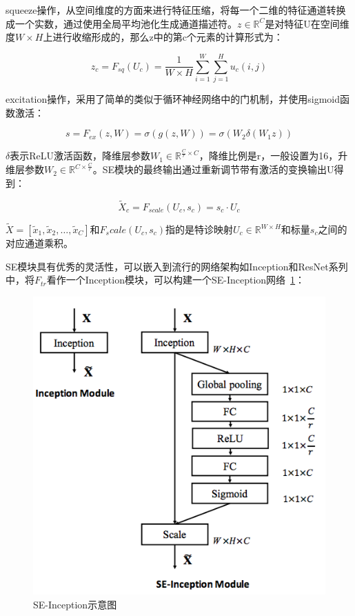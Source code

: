 squeeze操作，从空间维度的方面来进行特征压缩，将每一个二维的特征通道转换成一个实数，通过使用全局平均池化生成通道描述符。$z \in \mathbb{R}^C$是对特征U在空间维度$W \times H$上进行收缩形成的，那么z中的第c个元素的计算形式为：

\begin{displaymath}
	z_c = F_{sq}(U_c) = \frac{1}{W \times H}\sum_{i=1}^{W}\sum_{j=1}^{H}u_c(i, j)
\end{displaymath}

excitation操作，采用了简单的类似于循环神经网络中的门机制，并使用sigmoid函数激活：

\begin{displaymath}
	s = F_{ex}(z, W) = \sigma(g(z, W)) = \sigma(W_2 \delta (W_1z))
\end{displaymath}

$\delta$表示ReLU激活函数，降维层参数$W_1 \in \mathbb{R}^{\frac{C}{r} \times C}$，降维比例是r，一般设置为16，升维层参数$W_2 \in \mathbb{R}^{C \times \frac{C}{r}}$。SE模块的最终输出通过重新调节带有激活的变换输出U得到：

\begin{displaymath}
	\tilde{X}_c = F_{scale}(U_c, s_c) = s_c \cdot U_c
\end{displaymath}

$\tilde{X}=[\tilde{x}_1, \tilde{x}_2,\dots, \tilde{x}_C]$和$F_scale(U_c, s_c)$指的是特诊映射$U_c \in \mathbb{R}^{W \times H}$和标量$s_c$之间的对应通道乘积。

SE模块具有优秀的灵活性，可以嵌入到流行的网络架构如Inception和ResNet系列中，将$F_{tr}$看作一个Inception模块，可以构建一个SE-Inception网络~\ref{fig:SE-Inception}：

\begin{figure}[htbp!]
	\centering
	\includegraphics[width=0.5\linewidth]{readings_figures/SE_Inception_module.png}
	\caption{SE-Inception示意图}
	\label{fig:SE-Inception}
\end{figure}

